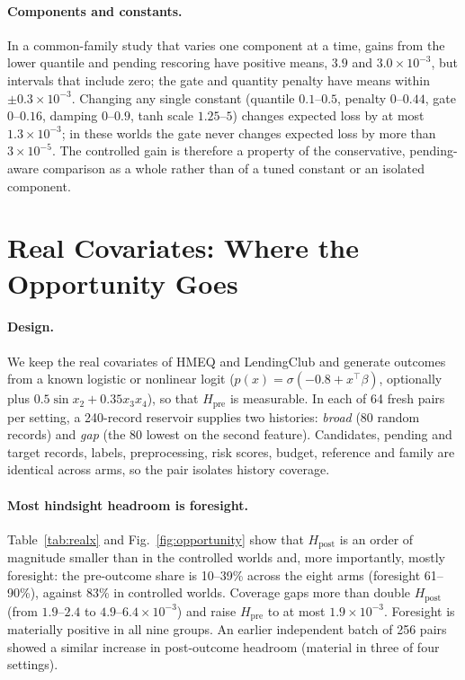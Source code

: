 \documentclass[runningheads]{llncs}
\begin{document}
\paragraph{Components and constants.} In a common-family study that varies one component at a time, gains from the lower quantile and pending rescoring have positive means, $3.9$ and $3.0\times10^{-3}$, but intervals that include zero; the gate and quantity penalty have means within $\pm0.3\times10^{-3}$. Changing any single constant (quantile $0.1$--$0.5$, penalty $0$--$0.44$, gate $0$--$0.16$, damping $0$--$0.9$, tanh scale $1.25$--$5$) changes expected loss by at most $1.3\times10^{-3}$; in these worlds the gate never changes expected loss by more than $3\times10^{-5}$. The controlled gain is therefore a property of the conservative, pending-aware comparison as a whole rather than of a tuned constant or an isolated component.

\section{Real Covariates: Where the Opportunity Goes}
\label{sec:realx}
\paragraph{Design.} We keep the real covariates of HMEQ and LendingClub and generate outcomes from a known logistic or nonlinear logit ($p(x)=\sigma(-0.8+x^\top\beta)$, optionally plus $0.5\sin x_2+0.35x_3x_4$), so that $H_{\mathrm{pre}}$ is measurable. In each of 64 fresh pairs per setting, a 240-record reservoir supplies two histories: \emph{broad} (80 random records) and \emph{gap} (the 80 lowest on the second feature). Candidates, pending and target records, labels, preprocessing, risk scores, budget, reference and family are identical across arms, so the pair isolates history coverage.

\paragraph{Most hindsight headroom is foresight.} Table~\ref{tab:realx} and Fig.~\ref{fig:opportunity} show that $H_{\mathrm{post}}$ is an order of magnitude smaller than in the controlled worlds and, more importantly, mostly foresight: the pre-outcome share is 10--39\% across the eight arms (foresight 61--90\%), against 83\% in controlled worlds. Coverage gaps more than double $H_{\mathrm{post}}$ (from $1.9$--$2.4$ to $4.9$--$6.4\times10^{-3}$) and raise $H_{\mathrm{pre}}$ to at most $1.9\times10^{-3}$. Foresight is materially positive in all nine groups. An earlier independent batch of 256 pairs showed a similar increase in post-outcome headroom (material in three of four settings).
\end{document}
